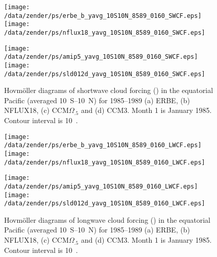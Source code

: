 \documentclass[twocolumn,final,11pt]{article}
\begin{document}
\begin{figure*}
\begin{center}
\texttt{[image: /data/zender/ps/erbe\_b\_yavg\_10S10N\_8589\_0160\_SWCF.eps]}%
\texttt{[image: /data/zender/ps/nflux18\_yavg\_10S10N\_8589\_0160\_SWCF.eps]}%

\texttt{[image: /data/zender/ps/amip5\_yavg\_10S10N\_8589\_0160\_SWCF.eps]}%
\texttt{[image: /data/zender/ps/sld012d\_yavg\_10S10N\_8589\_0160\_SWCF.eps]}%
\end{center}
\caption[Hovm\"oller diagrams of shortwave cloud forcing 
in the equatorial Pacific for 1985--1989 ERBE, NFLUX18,
CCM$\Omega_{.5}$, and CCM3]{ 
Hovm\"oller diagrams of shortwave cloud forcing (\wxmS) in the
equatorial Pacific (averaged 10~\degreee S--10~\degreee N) for
1985--1989 (a) ERBE, (b) NFLUX18, (c) CCM$\Omega_{.5}$ and (d) 
CCM3.
Month 1 is January 1985.  
Contour interval is 10~\wxmS. 
\label{fig:yavg_10S10N_8589_0160_SWCF}}
\end{figure*}
\clearpage

\begin{figure*}
\begin{center}
\texttt{[image: /data/zender/ps/erbe\_b\_yavg\_10S10N\_8589\_0160\_LWCF.eps]}%
\texttt{[image: /data/zender/ps/nflux18\_yavg\_10S10N\_8589\_0160\_LWCF.eps]}%

\texttt{[image: /data/zender/ps/amip5\_yavg\_10S10N\_8589\_0160\_LWCF.eps]}%
\texttt{[image: /data/zender/ps/sld012d\_yavg\_10S10N\_8589\_0160\_LWCF.eps]}%
\end{center}
\caption[Hovm\"oller diagrams of longwave cloud forcing 
in the equatorial Pacific for 1985--1989 ERBE, NFLUX18,
CCM$\Omega_{.5}$, and CCM3]{ 
Hovm\"oller diagrams of longwave cloud forcing (\wxmS) in the
equatorial Pacific (averaged 10~\degreee S--10~\degreee N) for
1985--1989 (a) ERBE, (b) NFLUX18, (c) CCM$\Omega_{.5}$ and (d) 
CCM3.
Month 1 is January 1985.  
Contour interval is 10~\wxmS. 
\label{fig:yavg_10S10N_8589_0160_LWCF}}
\end{figure*}
\clearpage
\end{document}
